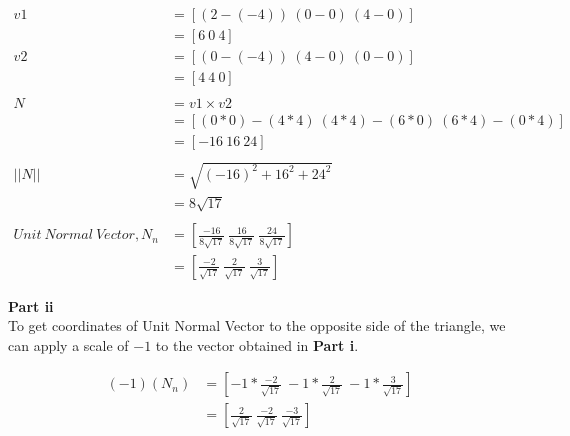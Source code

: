 \documentclass{article}
\begin{document}
\[
        \begin{split}
            v1 &= [(2 - (-4))\ (0 - 0)\ (4 - 0)]
            \\
            &= [6\ 0\ 4]
            \\
            v2 &= [(0 - (-4))\ (4 - 0)\ (0 - 0)]
            \\
            &= [4\ 4\ 0]
            \\\\
            N &= v1 \times v2
            \\
            &= [(0*0)-(4*4)\ (4*4)-(6*0)\ (6*4)-(0*4)]
            \\
            &= [-16\ 16\ 24]
            \\\\
            ||N|| &= \sqrt{(-16)^{2} + 16^{2} + 24^{2}}
            \\
            &= 8\sqrt{17}
            \\\\
            Unit\ Normal\ Vector, N_n &= \left[\frac{-16}{8\sqrt{17}}\ \frac{16}{8\sqrt{17}}\ \frac{24}{8\sqrt{17}}\right]
            \\
            &= \left[\frac{-2}{\sqrt{17}}\ \frac{2}{\sqrt{17}}\ \frac{3}{\sqrt{17}}\right]
        \end{split}
    \]

    \textbf{Part ii}\\
    To get coordinates of Unit Normal Vector to the opposite side of the triangle, we can apply a scale of \(-1\)
    to the vector obtained in \textbf{Part i}.

    \[
        \begin{split}
        (-1)(N_n) &= \left[-1*\frac{-2}{\sqrt{17}}\ -1*\frac{2}{\sqrt{17}}\ -1*\frac{3}{\sqrt{17}}\right]
        \\
        &= \left[\frac{2}{\sqrt{17}}\ \frac{-2}{\sqrt{17}}\ \frac{-3}{\sqrt{17}}\right]
        \end{split}
    \]
    
\end{document}

